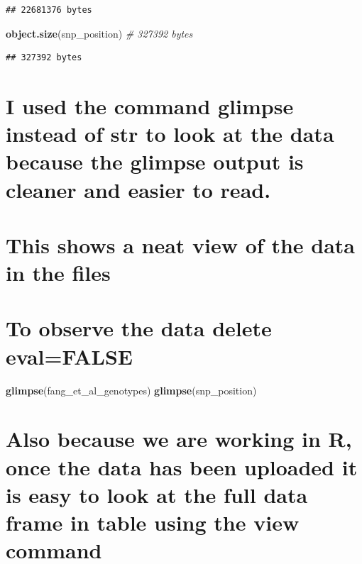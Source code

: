 \documentclass[
]{article}
\newenvironment{Shaded}{\begin{snugshade}}{\end{snugshade}}
\newcommand{\CommentTok}[1]{\textcolor[rgb]{0.56,0.35,0.01}{\textit{#1}}}
\newcommand{\FunctionTok}[1]{\textcolor[rgb]{0.13,0.29,0.53}{\textbf{#1}}}
\newcommand{\NormalTok}[1]{#1}
\begin{document}
\begin{verbatim}
## 22681376 bytes
\end{verbatim}

\begin{Shaded}
\begin{Highlighting}[]
\FunctionTok{object.size}\NormalTok{(snp\_position) }\CommentTok{\# 327392 bytes}
\end{Highlighting}
\end{Shaded}

\begin{verbatim}
## 327392 bytes
\end{verbatim}

\section{I used the command glimpse instead of str to look at the data
because the glimpse output is cleaner and easier to
read.}\label{i-used-the-command-glimpse-instead-of-str-to-look-at-the-data-because-the-glimpse-output-is-cleaner-and-easier-to-read.}

\section{This shows a neat view of the data in the
files}\label{this-shows-a-neat-view-of-the-data-in-the-files}

\section{To observe the data delete
eval=FALSE}\label{to-observe-the-data-delete-evalfalse}

\begin{Shaded}
\begin{Highlighting}[]
\FunctionTok{glimpse}\NormalTok{(fang\_et\_al\_genotypes)}
\FunctionTok{glimpse}\NormalTok{(snp\_position)}
\end{Highlighting}
\end{Shaded}

\section{Also because we are working in R, once the data has been
uploaded it is easy to look at the full data frame in table using the
view
command}\label{also-because-we-are-working-in-r-once-the-data-has-been-uploaded-it-is-easy-to-look-at-the-full-data-frame-in-table-using-the-view-command}
\end{document}

